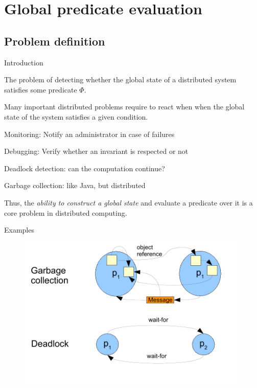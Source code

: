 \section{Global predicate evaluation}

\subsection{Problem definition}

\begin{frame}{Introduction}

\begin{definition}
The problem of detecting whether the global state of a distributed system satisfies
some predicate $\Phi$.
\end{definition}

\bigskip
{}
\BIL
\item Many important distributed problems require to react when when the global
  state of the system satisfies a given condition.
  \BI
  \item \alert{Monitoring}: Notify an administrator in
    case of failures
  \item \alert{Debugging}: Verify whether an invariant 
    is respected or not
  \item \alert{Deadlock detection}: can the computation continue?
  \item \alert{Garbage collection}: like Java, but distributed
  \EI
\item Thus, the \emph{ability to construct a global state} and 
  evaluate a predicate over it is a core
  problem in distributed computing.
\EIL
\end{frame}

\begin{frame}{Examples}

\begin{figure} 
\includegraphics[width=11cm]{figs/03/gpe}
\end{figure}

\end{frame}



